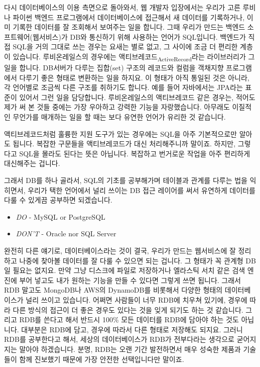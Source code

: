 \documentclass[11pt,a4paper]{article}
\begin{document}
다시 데이터베이스의 이용 측면으로 돌아와서, 웹 개발자 입장에서는 우리가 고른 루비나 파이썬 백엔드 프로그램에서 데이터베이스에 접근해서 새 데이터를 기록하거나, 이미 기록한 데이터를 잘 조회해서 보여주는 일을 합니다. 그때 우리가 만드는 백엔드 소프트웨어(웹서비스)가 DB와 통신하기 위해 사용하는 언어가 SQL입니다. 백엔드가 직접 SQL을 거의 그대로 쓰는 경우는 요새는 별로 없고, 그 사이에 조금 더 편리한 계층이 있습니다. 루비온레일스의 경우에는 액티브레코드\textsubscript{ActiveRecord}라는 라이브러리가 그 일을 합니다. DB서버가 다루는 집합(set) 구조의 레코드와 컬럼을 객채지향 프로그램에서 다루기 좋은 형태로 변환하는 일을 하지요. 이 형태가 아직 통일된 것은 아니라, 각 언어별로 조금씩 다른 구조를 취하기도 합니다. 예를 들어 자바에서는 JPA라는 표준이 있어서 그런 일을 담당합니다. 루비온레일스의 액티브레코드 같은 경우는, 적어도 제가 써 본 것들 중에는 가장 우아하고 강력한 기능을 자랑했습니다. 아무래도 이질적인 무언가를 매개하는 일을 할 때는 보다 유연한 언어가 유리한 것 같습니다.

액티브레코드처럼 훌륭한 지원 도구가 있는 경우에는 SQL을 아주 기본적으로만 알아도 됩니다. 복잡한 구문들을 액티브레코드가 대신 처리해주니까 말이죠. 하지만, 그렇다고 SQL을 몰라도 된다는 뜻은 아닙니다. 복잡하고 번거로운 작업을 아주 편리하게 대신해주는 겁니다.

그래서 DB를 하나 골라서, SQL의 기초를 공부해가며 테이블과 관계를 다루는 법을 익히면서, 우리가 택한 언어에서 널리 쓰이는 DB 접근 레이어를 써서 유연하게 데이터를 다룰 수 있게끔 공부하면 되겠습니다.

\begin{itemize}
\item \emph{DO} - MySQL or PostgreSQL
\item \emph{DON'T} - Oracle nor SQL Server
\end{itemize}

완전히 다른 얘기로, 데이터베이스라는 것이 결국, 우리가 만드는 웹서비스에 잘 정리하고 나중에 찾아볼 데이터를 잘 다룰 수 있으면 되는 겁니다. 그 형태가 꼭 관계형 DB일 필요는 없지요. 만약 그냥 디스크에 파일로 저장하거나 엘라스틱 서치 같은 검색 엔진에 부어 넣고도 내가 원하는 기능을 만들 수 있다면 그렇게 쓰면 됩니다. 그래서 RDB 말고도 MongoDB나 AWS의 DynamoDB를 비롯해서 다양한 형태의 데이터베이스가 널리 쓰이고 있습니다. 어쩌면 사람들이 너무 RDB에 치우쳐 있기에, 경우에 따라 다른 방식의 접근이 더 좋은 경우도 있다는 것을 잊게 되기도 하는 것 같습니다. 그리고 RDB를 쓴다고 해서 반드시 100\% 모든 데이터를 RDB에 담아야 하는 것도 아닙니다. 대부분은 RDB에 담고, 경우에 따라서 다른 형태로 저장해도 되지요. 그러니 RDB를 공부한다고 해서, 세상의 데이터베이스가 RDB가 전부다라는 생각으로 굳어지지는 말아야 하겠습니다. 분명, RDB는 오랜 기간 발전하면서 매우 성숙한 제품과 기술들이 함께 진보했기 때문에 가장 안전한 선택입니다만 말이죠.
\end{document}

